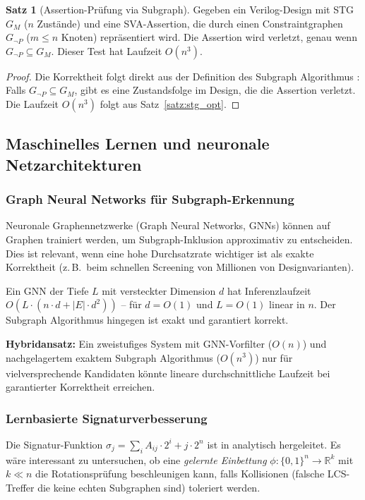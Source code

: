 ﻿\documentclass[a4paper,12pt]{article}
\theoremstyle{definition}
\newtheorem{satz}{Satz}
\begin{document}
\begin{satz}[Assertion-Prüfung via Subgraph]\label{satz:assertion}
  Gegeben ein Verilog-Design mit STG $G_M$ ($n$ Zustände) und eine
  SVA-Assertion, die durch einen Constraintgraphen $G_{\neg P}$ ($m \leq n$ Knoten)
  repräsentiert wird. Die Assertion wird verletzt, genau wenn $G_{\neg P} \subseteq G_M$.
  Dieser Test hat Laufzeit $O(n^3)$.
\end{satz}

\begin{proof}
  Die Korrektheit folgt direkt aus der Definition des Subgraph Algorithmus
  \cite{subgraph2026}: Falls $G_{\neg P} \subseteq G_M$, gibt es eine
  Zustandsfolge im Design, die die Assertion verletzt. Die Laufzeit $O(n^3)$
  folgt aus Satz~\ref{satz:stg_opt}.
\end{proof}

\subsection{Maschinelles Lernen und neuronale Netzarchitekturen}

\subsubsection{Graph Neural Networks für Subgraph-Erkennung}

Neuronale Graphennetzwerke (Graph Neural Networks, GNNs) \cite{schur2022gnn_survey}
können auf Graphen trainiert werden, um Subgraph-Inklusion approximativ zu entscheiden.
Dies ist relevant, wenn eine hohe Durchsatzrate wichtiger ist als exakte Korrektheit
(z.\,B.\ beim schnellen Screening von Millionen von Designvarianten).

Ein GNN der Tiefe $L$ mit versteckter Dimension $d$ hat Inferenzlaufzeit
$O(L \cdot (n \cdot d + |E| \cdot d^2))$ -- für $d = O(1)$ und $L = O(1)$ linear in $n$.
Der Subgraph Algorithmus hingegen ist exakt und garantiert korrekt.

\textbf{Hybridansatz:} Ein zweistufiges System mit GNN-Vorfilter ($O(n)$) und
nachgelagertem exaktem Subgraph Algorithmus ($O(n^3)$) nur für vielversprechende
Kandidaten könnte lineare durchschnittliche Laufzeit bei garantierter Korrektheit
erreichen.

\subsubsection{Lernbasierte Signaturverbesserung}

Die Signatur-Funktion $\sigma_j = \sum_i A_{ij} \cdot 2^i + j \cdot 2^n$ ist in
\cite{subgraph2026} analytisch hergeleitet. Es wäre interessant zu untersuchen, ob
eine \emph{gelernte Einbettung} $\phi: \{0,1\}^n \to \mathbb{R}^k$ mit $k \ll n$
die Rotationsprüfung beschleunigen kann, falls Kollisionen (falsche LCS-Treffer die
keine echten Subgraphen sind) toleriert werden.
\end{document}
